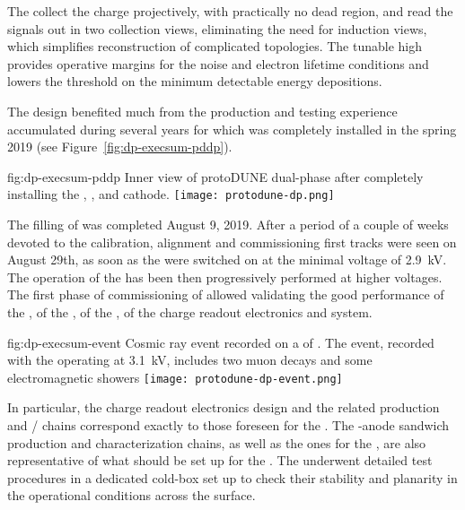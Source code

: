The  collect the charge projectively,  with practically no dead region, and read the signals out  in two collection views, eliminating the need for  induction views,  which  simplifies reconstruction of complicated topologies. The tunable high  provides operative margins for the noise and electron lifetime conditions and lowers the threshold on the minimum detectable energy depositions.

The  design benefited much from the production and testing experience accumulated during several years for  which was completely installed in the spring 2019
(see Figure~\ref{fig:dp-execsum-pddp}). 

\begin{dunefigure}{fig:dp-execsum-pddp}
  {Inner view of protoDUNE dual-phase after completely installing the , , and cathode.}
  \texttt{[image: protodune-dp.png]}
\end{dunefigure}

The filling of  was completed August 9, 2019. After a period of a couple of weeks devoted to the  calibration, alignment and commissioning first tracks were seen on August 29th, as soon as the  were switched on at the minimal voltage of \SI{2.9}{kV}. The operation of the  has been then progressively performed at higher voltages. The first phase of commissioning of  allowed validating the good performance of the , of the , of the , of the charge readout electronics and  system.

\begin{dunefigure}{fig:dp-execsum-event}
  {Cosmic ray event recorded on a  of . The event, recorded with the  operating at \SI{3.1}{kV}, includes two muon decays and some electromagnetic showers }
  \texttt{[image: protodune-dp-event.png]}
\end{dunefigure}

In particular, the charge readout electronics design and the related production and / chains correspond exactly to those foreseen for the . The -anode sandwich production and characterization chains, as well as the ones for the  ,  are also representative of what should be set up for the . The  underwent detailed test procedures in a dedicated cold-box set up to check their  stability and planarity in the operational conditions across the  surface.

